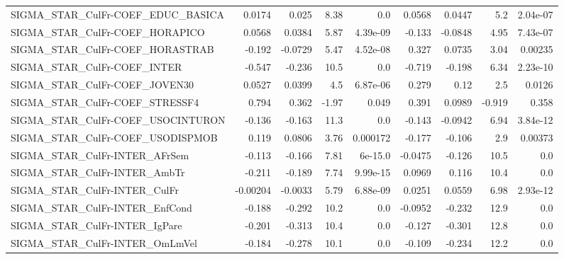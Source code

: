 \begin{tabular}{lrrrrrrrr}
SIGMA\_STAR\_CulFr-COEF\_EDUC\_BASICA     &      0.0174 &        0.025 &     8.38 &      0.0 &     0.0568 &      0.0447 &          5.2 &      2.04e-07 \\
SIGMA\_STAR\_CulFr-COEF\_HORAPICO        &      0.0568 &       0.0384 &     5.87 & 4.39e-09 &     -0.133 &     -0.0848 &         4.95 &      7.43e-07 \\
SIGMA\_STAR\_CulFr-COEF\_HORASTRAB       &      -0.192 &      -0.0729 &     5.47 & 4.52e-08 &      0.327 &      0.0735 &         3.04 &       0.00235 \\
SIGMA\_STAR\_CulFr-COEF\_INTER           &      -0.547 &       -0.236 &     10.5 &      0.0 &     -0.719 &      -0.198 &         6.34 &      2.23e-10 \\
SIGMA\_STAR\_CulFr-COEF\_JOVEN30         &      0.0527 &       0.0399 &      4.5 & 6.87e-06 &      0.279 &        0.12 &          2.5 &        0.0126 \\
SIGMA\_STAR\_CulFr-COEF\_STRESSF4        &       0.794 &        0.362 &    -1.97 &    0.049 &      0.391 &      0.0989 &       -0.919 &         0.358 \\
SIGMA\_STAR\_CulFr-COEF\_USOCINTURON     &      -0.136 &       -0.163 &     11.3 &      0.0 &     -0.143 &     -0.0942 &         6.94 &      3.84e-12 \\
SIGMA\_STAR\_CulFr-COEF\_USODISPMOB      &       0.119 &       0.0806 &     3.76 & 0.000172 &     -0.177 &      -0.106 &          2.9 &       0.00373 \\
SIGMA\_STAR\_CulFr-INTER\_AFrSem         &      -0.113 &       -0.166 &     7.81 &  6e-15.0 &    -0.0475 &      -0.126 &         10.5 &           0.0 \\
SIGMA\_STAR\_CulFr-INTER\_AmbTr          &      -0.211 &       -0.189 &     7.74 & 9.99e-15 &     0.0969 &       0.116 &         10.4 &           0.0 \\
SIGMA\_STAR\_CulFr-INTER\_CulFr          &    -0.00204 &      -0.0033 &     5.79 & 6.88e-09 &     0.0251 &      0.0559 &         6.98 &      2.93e-12 \\
SIGMA\_STAR\_CulFr-INTER\_EnfCond        &      -0.188 &       -0.292 &     10.2 &      0.0 &    -0.0952 &      -0.232 &         12.9 &           0.0 \\
SIGMA\_STAR\_CulFr-INTER\_IgPare         &      -0.201 &       -0.313 &     10.4 &      0.0 &     -0.127 &      -0.301 &         12.8 &           0.0 \\
SIGMA\_STAR\_CulFr-INTER\_OmLmVel        &      -0.184 &       -0.278 &     10.1 &      0.0 &     -0.109 &      -0.234 &         12.2 &           0.0 \\

\end{tabular}
